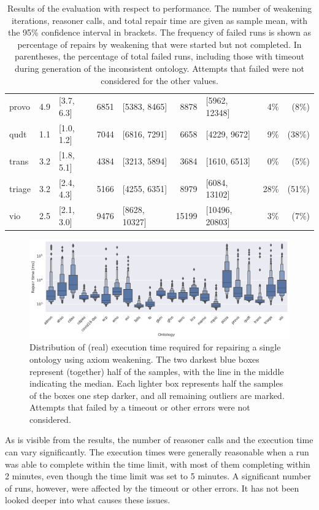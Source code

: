 \begin{table}[ht]
\begin{tabular}{|l|r@{ }lr@{ }lr@{ }lr@{ }r|}
    provo & 4.9 & [3.7, 6.3] & 6851 & [5383, 8465] & 8878 & [5962, 12348] & 4\% & (8\%) \\
    qudt & 1.1 & [1.0, 1.2] & 7044 & [6816, 7291] & 6658 & [4229, 9672] & 9\% & (38\%) \\
    trans & 3.2 & [1.8, 5.1] & 4384 & [3213, 5894] & 3684 & [1610, 6513] & 0\% & (5\%) \\
    triage & 3.2 & [2.4, 4.3] & 5166 & [4255, 6351] & 8979 & [6084, 13102] & 28\% & (51\%) \\
    vio & 2.5 & [2.1, 3.0] & 9476 & [8628, 10327] & 15199 & [10496, 20803] & 3\% & (7\%) \\
    \hline
  \end{tabular}
  \caption{Results of the evaluation with respect to performance. The number of weakening iterations, reasoner calls, and total repair time are given as sample mean, with the 95\% confidence interval in brackets. The frequency of failed runs is shown as percentage of repairs by weakening that were started but not completed. In parentheses, the percentage of total failed runs, including those with timeout during generation of the inconsistent ontology. Attempts that failed were not considered for the other values.}
  \label{table:results-perf}
\end{table}

\begin{figure}[ht]
  \centering
  \includegraphics[width=\textwidth]{resources/time-ontology-violin.png}
  \caption{Distribution of (real) execution time required for repairing a single ontology using axiom weakening. The two darkest blue boxes represent (together) half of the samples, with the line in the middle indicating the median. Each lighter box represents half the samples of the boxes one step darker, and all remaining outliers are marked. Attempts that failed by a timeout or other errors were not considered.}
  \label{fig:results-perf-time}
\end{figure}

As is visible from the results, the number of reasoner calls and the execution time can vary significantly. The execution times were generally reasonable when a run was able to complete within the time limit, with most of them completing within 2 minutes, even though the time limit was set to 5 minutes. A significant number of runs, however, were affected by the timeout or other errors. It has not been looked deeper into what causes these issues.

